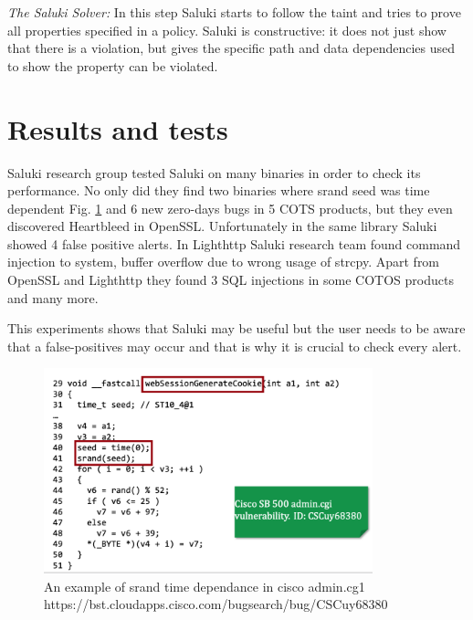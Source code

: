 \documentclass[a4paper, 12pt, journal, onecolumn]{IEEEtran}
\begin{document}
\bigskip
\textit{The Saluki Solver:} In this step Saluki starts to follow the taint and tries to prove all properties specified in a policy. Saluki is constructive: it does not just show that there is a violation, but gives the specific path and data dependencies used to show the property can be violated.



\section{Results and tests}

Saluki research group tested Saluki on many binaries in order to check its performance. No only did they find two binaries where srand seed was time dependent Fig. \ref{fig:bug} and 6 new zero-days bugs in 5 COTS products, but they even discovered Heartbleed in OpenSSL. Unfortunately in the same library Saluki showed 4 false positive alerts.
In Lighthttp Saluki research team found command injection to system, buffer overflow due to wrong usage of strcpy. Apart from OpenSSL and Lighthttp they found 3 SQL injections in some COTOS products and many more.


This experiments shows that Saluki may be useful but the user needs to be aware that a false-positives may occur and that is why it is crucial to check every alert. 

\begin{figure}[h]
    \centering
    \captionsetup{justification=centering}
    \includegraphics[width=0.85\textwidth]{bug.png}
    \caption{An example of srand time dependance in cisco admin.cg1\\
    \small{https://bst.cloudapps.cisco.com/bugsearch/bug/CSCuy68380}}
    \label{fig:bug}
\end{figure}
\end{document}
